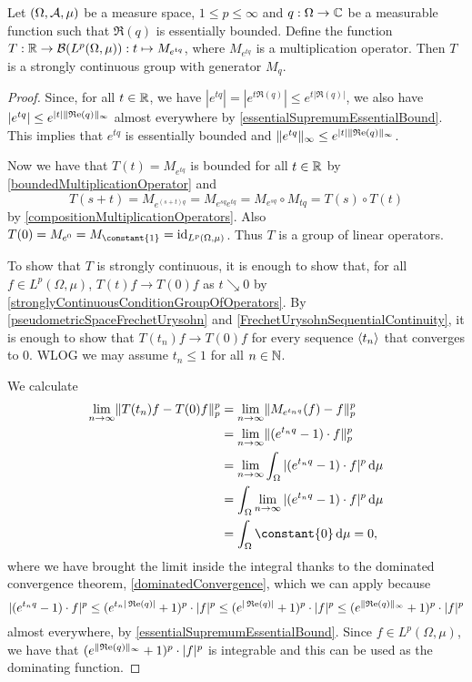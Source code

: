 \begin{proposition}
Let $\sSet{\Omega, \mathcal{A}, \mu}$ be a measure space, $1\leq p \leq \infty$ and $q: \Omega \to \mathbb{C}$ be a measurable function such that $\Re(q)$ is essentially bounded. Define the function $T: \mathbb{R}\to \operatorname{\mathcal{B}}(L^p(\Omega, \mu)): t\mapsto M_{e^{tq}}$, where $M_{e^{tq}}$ is a multiplication operator. Then $T$ is a strongly continuous group with generator $M_q$.
\end{proposition}
\begin{proof}
Since, for all $t\in\mathbb{R}$, we have $|e^{tq}| = |e^{t\Re(q)}| \leq e^{t|\Re(q)|}$, we also have $|e^{tq}| \leq e^{|t|\lVert\operatorname{\mathfrak{R}e}(q)\rVert_\infty}$ almost everywhere by \ref{essentialSupremumEssentialBound}. This implies that $e^{tq}$ is essentially bounded and $\lVert e^{tq}\rVert_\infty \leq e^{|t|\lVert\operatorname{\mathfrak{R}e}(q)\rVert_\infty}$.

Now we have that $T(t) = M_{e^{tq}}$ is bounded for all $t\in \mathbb{R}$ by \ref{boundedMultiplicationOperator} and
\[ T(s+t) = M_{e^{(s+t)q}} = M_{e^{sq}e^{tq}} = M_{e^{sq}}\circ M_{tq} = T(s)\circ T(t) \]
by \ref{compositionMultiplicationOperators}. Also $T(0) = M_{e^{0}} = M_{\constant{1}} = \id_{L^p(\Omega, \mu)}$. Thus $T$ is a group of linear operators.

To show that $T$ is strongly continuous, it is enough to show that, for all $f\in L^p(\Omega, \mu)$, $T(t)f \to T(0)f$ as $t\searrow 0$ by \ref{stronglyContinuousConditionGroupOfOperators}. By \ref{pseudometricSpaceFrechetUrysohn} and \ref{FrechetUrysohnSequentialContinuity}, it is enough to show that $T(t_n)f \to T(0)f$ for every sequence $\left\langle t_n \right\rangle$ that converges to $0$. WLOG we may assume $t_n \leq 1$ for all $n\in \mathbb{N}$. 

We calculate
\begin{align*}
\lim_{n\to \infty} \norm{T(t_n)f - T(0)f}_p^p &= \lim_{n\to \infty}\norm{M_{e^{t_nq}}(f) - f}_p^p \\
&= \lim_{n\to \infty} \norm{(e^{t_nq} - 1)\cdot f}_p^p \\
&= \lim_{n\to \infty} \int_\Omega |(e^{t_nq} - 1)\cdot f|^p \diff{\mu} \\
&= \int_\Omega \lim_{n\to \infty} |(e^{t_nq} - 1)\cdot f|^p \diff{\mu} \\
&= \int_\Omega \constant{0} \diff{\mu} = 0,
\end{align*}
where we have brought the limit inside the integral thanks to the dominated convergence theorem, \ref{dominatedConvergence}, which we can apply because
\[ |(e^{t_nq} - 1)\cdot f|^p \leq (e^{t_n|\operatorname{\mathfrak{R}e}(q)|} + 1)^p\cdot |f|^p \leq (e^{|\operatorname{\mathfrak{R}e}(q)|} + 1)^p\cdot |f|^p \leq (e^{\lVert\operatorname{\mathfrak{R}e}(q)\rVert_\infty} + 1)^p\cdot |f|^p \]
almost everywhere, by \ref{essentialSupremumEssentialBound}. Since $f\in L^p(\Omega,\mu)$, we have that $(e^{\lVert\operatorname{\mathfrak{R}e}(q)\rVert_\infty} + 1)^p\cdot |f|^p$ is integrable and this can be used as the dominating function.


\end{proof}
